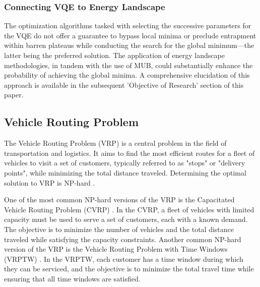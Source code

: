 \subsubsection{Connecting VQE to Energy Landscape}
The optimization algorithms tasked with selecting the successive parameters for the VQE
do not offer a guarantee to bypass local minima or preclude entrapment within barren plateaus while conducting the search
for the global minimum—the latter being the preferred solution.
The application of energy landscape methodologies, in tandem with the use of MUB, could substantially enhance the probability of achieving the global minima.
A comprehensive elucidation of this approach is available in the subsequent 'Objective of Research' section of this paper.

\subsection{Vehicle Routing Problem}\label{subsec:vehicle-routing-problem}

The Vehicle Routing Problem (VRP) is a central problem in the field of transportation and logistics.
It aims to find the most efficient routes for a fleet of vehicles to visit a set of customers,
typically referred to as "stops" or "delivery points", while minimizing the total distance traveled.
Determining the optimal solution to VRP is NP-hard \cite{toth2002vehicle}.

One of the most common NP-hard versions of the VRP is the Capacitated Vehicle Routing Problem (CVRP) \cite{Toth2014}.
In the CVRP, a fleet of vehicles with limited capacity must be used to serve a set of customers, each with a known
demand. The objective is to minimize the number of vehicles and the total distance traveled while satisfying
the capacity constraints.
Another common NP-hard version of the VRP is the Vehicle Routing Problem with Time Windows (VRPTW) \cite{Desrochers1992}.
In the VRPTW, each customer has a time window during which they can be serviced, and the objective is to minimize
the total travel time while ensuring that all time windows are satisfied.

